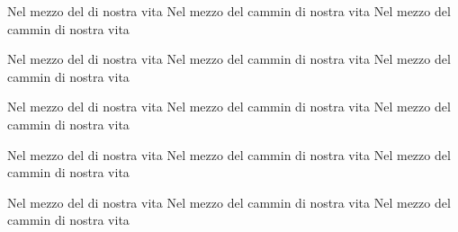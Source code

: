 \documentclass[11pt,a4paper,twoside]{book}
\begin{document}
\pstart\label{10}%
%
Nel mezzo del  di nostra vita Nel mezzo del cammin di nostra vita Nel mezzo del cammin di nostra vita
\pend

\pstart\label{11}%
%
Nel mezzo del  di nostra vita Nel mezzo del cammin di nostra vita Nel mezzo del cammin di nostra vita
\pend

\pstart\label{12}%
%
Nel mezzo del  di nostra vita Nel mezzo del cammin di nostra vita Nel mezzo del cammin di nostra vita
\pend

\pstart\label{13}%
%
Nel mezzo del  di nostra vita Nel mezzo del cammin di nostra vita Nel mezzo del cammin di nostra vita
\pend

\pstart\label{14}%
%
Nel mezzo del  di nostra vita Nel mezzo del cammin di nostra vita Nel mezzo del cammin di nostra vita
\pend

\numberpstartfalse
\endnumbering
\end{document}
